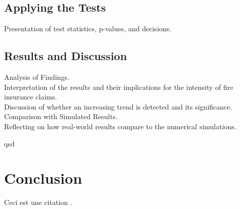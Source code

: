 \documentclass{journalstyle}
\begin{document}
\subsection{Applying the Tests}
Presentation of test statistics, p-values, and decisions. \\

\subsection{Results and Discussion}
Analysis of Findings. \\
Interpretation of the results and their implications for the intensity of fire insurance claims. \\
Discussion of whether an increasing trend is detected and its significance. \\
Comparison with Simulated Results. \\
Reflecting on how real-world results compare to the numerical simulations.

\newpage qsd



\section{Conclusion}
Ceci est une citation \cite{smith2020example}.



\printbibliography
\end{document}
